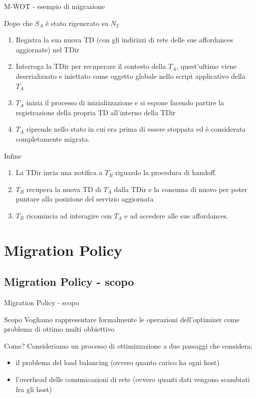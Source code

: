\documentclass{beamer}
\begin{document}
\begin{frame}[allowframebreaks]{M-WOT - esempio di migrazione}
\pagebreak

\begin{block}{Dopo che $S_A$ è stato rigenerato su $N_2$}
	\begin{enumerate}
		\item Registra la sua nuova TD (con gli indirizzi di rete delle sue affordances aggiornate) nel TDir
		\item Interroga la TDir per recuperare il contesto della $T_A$, quest'ultimo viene deserializzato e iniettato come oggetto globale nello script applicativo della $T_A$
		\item $T_A$ inizia il processo di inizializzazione e si espone facendo partire la registrazione della propria TD all'interno della TDir
		\item $T_A$ riprende nello stato in cui era prima di essere stoppata ed è considerata completamente migrata.
	\end{enumerate}
\end{block}

\begin{block}{Infine}
	\begin{enumerate}
		\item La TDir invia una notifica a $T_B$ riguardo la procedura di handoff.
		\item $T_B$ recupera la nuova TD di $T_A$ dalla TDir e la consuma di nuovo per poter puntare alla posizione del servizio aggiornata
		\item $T_B$ ricomincia ad interagire con $T_A$ e ad accedere alle sue affordances.
	\end{enumerate}
\end{block}

\end{frame}

\section{Migration Policy}
\subsection{Migration Policy - scopo}
\begin{frame}{Migration Policy - scopo}
	\begin{block}{Scopo}
		Vogliamo rappresentare formalmente le operazioni dell'optimizer come problema di ottimo multi obbiettivo
	\end{block}
	\begin{block}{Come?}
		Consideriamo un processo di ottimizzazione a due passaggi che considera:
		\begin{itemize}
			\item il problema del load balancing (ovvero quanto carico ha ogni host)
			\item l'overhead delle comunicazioni di rete (ovvero quanti dati vengono scambiati fra gli host)
		\end{itemize}
	\end{block}
\end{frame}
\end{document}
